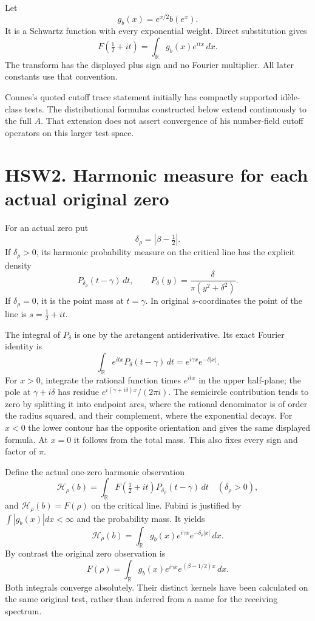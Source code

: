 Let \[
g_b(x)=e^{x/2}b(e^x).
\] It is a Schwartz function with every exponential weight. Direct
substitution gives \[
F(\tfrac12+it)=\int_{\mathbb R}g_b(x)e^{itx}\,dx.
\tag{HSW1.5}
\] The transform has the displayed plus sign and no Fourier multiplier.
All later constants use that convention.

Connes's quoted cutoff trace statement initially has compactly supported
idèle-class tests. The distributional formulas constructed below extend
continuously to the full \(A\). That extension does not assert
convergence of his number-field cutoff operators on this larger test
space.

\section{HSW2. Harmonic measure for each actual original
zero}\label{hsw2.-harmonic-measure-for-each-actual-original-zero}

For an actual zero put \[
\delta_\rho=|\beta-\tfrac12|.
\] If \(\delta_\rho>0\), its harmonic probability measure on the
critical line has the explicit density \[
P_{\delta_\rho}(t-\gamma)\,dt,\qquad
P_\delta(y)=\frac{\delta}{\pi(y^2+\delta^2)}.
\tag{HSW2.1}
\] If \(\delta_\rho=0\), it is the point mass at \(t=\gamma\). In
original \(s\)-coordinates the point of the line is \(s=\tfrac12+it\).

The integral of \(P_\delta\) is one by the arctangent antiderivative.
Its exact Fourier identity is \[
\int_{\mathbb R}e^{itx}P_\delta(t-\gamma)\,dt
=e^{i\gamma x}e^{-\delta|x|}.
\tag{HSW2.2}
\] For \(x>0\), integrate the rational function times \(e^{itx}\) in the
upper half-plane; the pole at \(\gamma+i\delta\) has residue
\(e^{i(\gamma+i\delta)x}/(2\pi i)\). The semicircle contribution tends
to zero by splitting it into endpoint arcs, where the rational
denominator is of order the radius squared, and their complement, where
the exponential decays. For \(x<0\) the lower contour has the opposite
orientation and gives the same displayed formula. At \(x=0\) it follows
from the total mass. This also fixes every sign and factor of \(\pi\).

Define the actual one-zero harmonic observation \[
\mathcal H_\rho(b)=
\int_{\mathbb R}F(\tfrac12+it)P_{\delta_\rho}(t-\gamma)\,dt
\quad(\delta_\rho>0),
\] and \(\mathcal H_\rho(b)=F(\rho)\) on the critical line. Fubini is
justified by \(\int|g_b(x)|dx<\infty\) and the probability mass. It
yields \[
\boxed{\mathcal H_\rho(b)=
\int_{\mathbb R}g_b(x)e^{i\gamma x}e^{-\delta_\rho|x|}\,dx.}
\tag{HSW2.3}
\] By contrast the original zero observation is \[
F(\rho)=\int_{\mathbb R}g_b(x)e^{i\gamma x}
e^{(\beta-1/2)x}\,dx.
\tag{HSW2.4}
\] Both integrals converge absolutely. Their distinct kernels have been
calculated on the same original test, rather than inferred from a name
for the receiving spectrum.

